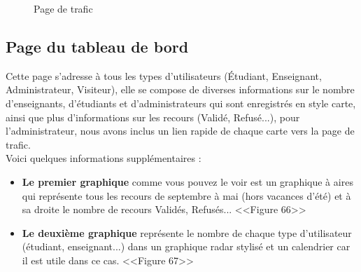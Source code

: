\documentclass[12pt]{report}
\begin{document}
\vspace{0.1in}

\begin{figure}[h]
\centering
\caption{Page de trafic}
\end{figure}

\newpage

\subsection{Page du tableau de bord}

Cette page s'adresse à tous les types d'utilisateurs (Étudiant, Enseignant, Administrateur, Visiteur), elle se compose de diverses informations sur le nombre d'enseignants, d'étudiants et d'administrateurs qui sont enregistrés en style carte, ainsi que plus d'informations sur les recours (Validé, Refusé...), pour l'administrateur, nous avons inclus un lien rapide de chaque carte vers la page de trafic.
\\
Voici quelques informations supplémentaires :

\begin{itemize}
  \item \textbf{Le premier graphique} comme vous pouvez le voir est un graphique à aires qui représente tous les recours de septembre à mai (hors vacances d'été) et à sa droite le nombre de recours Validés, Refusés... <<Figure 66>>
  \item \textbf{Le deuxième graphique} représente le nombre de chaque type d'utilisateur (étudiant, enseignant...) dans un graphique radar stylisé et un calendrier car il est utile dans ce cas. <<Figure 67>>
\end{itemize}
\end{document}
